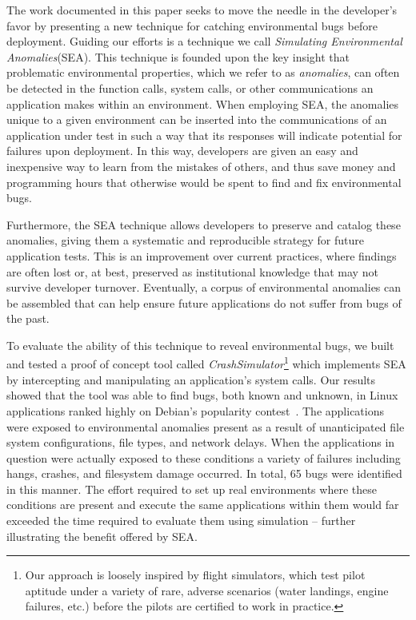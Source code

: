 The work documented in this paper
seeks to move the needle in the developer's favor
by presenting a new technique for catching environmental bugs
before deployment.
Guiding our efforts
is a technique
we call \textit{Simulating Environmental Anomalies}(SEA).
This technique is founded upon the key insight
that problematic environmental properties,
which we refer to as \textit{anomalies},
can often be detected
in the function calls,
system calls,
or other communications an application makes within an environment.
When employing SEA,
the anomalies
unique to a given environment
can be inserted into
the communications of an application under test
in such a way
that its responses will indicate potential
for failures upon deployment.
In this way,
developers are given
an easy and inexpensive way
to learn from the mistakes of others,
and thus save money and programming hours
that otherwise would be spent to find and fix
environmental bugs.

Furthermore,
the SEA technique
allows developers to preserve and catalog
these anomalies,
giving them a systematic and reproducible strategy for future application
tests.
This is an improvement over current practices,
where findings are often lost or,
at best, preserved as
institutional knowledge
that may not survive developer turnover.
Eventually,
a corpus of environmental anomalies can be assembled
that can help ensure
future applications do not suffer from bugs of the past.

To evaluate the ability of this technique to reveal environmental
bugs, we built and tested a proof of concept tool
called {\em CrashSimulator}\footnote{Our approach is
loosely inspired by flight simulators, which test pilot aptitude under a
variety of rare, adverse scenarios (water landings, engine failures, etc.)
before the pilots are certified to work in practice.}
which implements SEA
by intercepting and manipulating an application's system calls.
Our results showed that the tool was able to find bugs,
both known and unknown,
in Linux applications ranked highly on Debian's popularity
contest~\cite{DebPopCon}.
The applications were exposed
to environmental anomalies present as a result of unanticipated
file system configurations, file types, and network delays.
When the applications in
question were actually exposed to these conditions a variety of failures
including hangs, crashes, and filesystem damage occurred.  In total,
65 bugs were identified in this manner.
The effort required to set up real
environments where these conditions are present
and execute the same applications within them
would far exceeded the time required to evaluate them
using simulation -- further illustrating the benefit offered by SEA.

